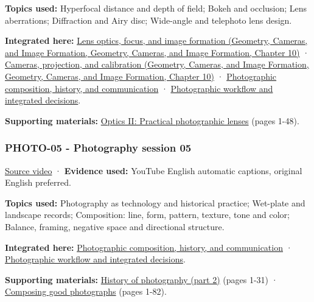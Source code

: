 \textbf{Topics used:} Hyperfocal distance and depth of field; Bokeh and occlusion; Lens aberrations; Diffraction and Airy disc; Wide-angle and telephoto lens design.

\textbf{Integrated here:} \href{../03-Geometry-Cameras-and-Image-Formation/main.pdf\#nameddest=03-visual-computing-i-ch003-lens-optics-focus-and-image-formation}{Lens optics, focus, and image formation (Geometry, Cameras, and Image Formation, Geometry, Cameras, and Image Formation, Chapter 10)} · \href{../03-Geometry-Cameras-and-Image-Formation/main.pdf\#nameddest=03-visual-computing-i-ch003-cameras-projection-and-calibration}{Cameras, projection, and calibration (Geometry, Cameras, and Image Formation, Geometry, Cameras, and Image Formation, Chapter 10)} · \hyperref[04-visual-computing-ii-ch034-photographic-composition-history-and-communication]{Photographic composition, history, and communication} · \hyperref[04-visual-computing-ii-ch034-photographic-workflow-and-integrated-decisions]{Photographic workflow and integrated decisions}.

\textbf{Supporting materials:} \href{https://drive.google.com/open?id=0B6w2XfPHEcZYTnZIR2VpWThHM0U}{Optics II: Practical photographic lenses} (pages 1-48).

\subsubsection{PHOTO-05 - Photography session 05}\label{04-visual-computing-ii-ch036-photo-05---photography-session-05}

\href{https://www.youtube.com/watch?v=VCcDJAiObEw}{Source video} · \textbf{Evidence used:} YouTube English automatic captions, original English preferred.

\textbf{Topics used:} Photography as technology and historical practice; Wet-plate and landscape records; Composition: line, form, pattern, texture, tone and color; Balance, framing, negative space and directional structure.

\textbf{Integrated here:} \hyperref[04-visual-computing-ii-ch034-photographic-composition-history-and-communication]{Photographic composition, history, and communication} · \hyperref[04-visual-computing-ii-ch034-photographic-workflow-and-integrated-decisions]{Photographic workflow and integrated decisions}.

\textbf{Supporting materials:} \href{https://drive.google.com/open?id=0B6w2XfPHEcZYNm5MczhBTkxsanc}{History of photography (part 2)} (pages 1-31) · \href{https://drive.google.com/file/d/0B6w2XfPHEcZYSkZXWG9mSGpFMVk/view?usp=sharing}{Composing good photographs} (pages 1-82).

